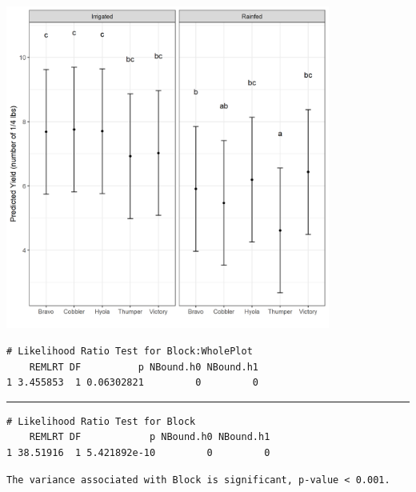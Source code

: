 \documentclass[a4paper, 10pt, fleqn, twosided]{memoir}
\begin{document}
\begin{tcolorbox}[title = Exercise 14 output continued]
\includegraphics[width=0.8\textwidth, frame]{Exercise14Pred.png}
\end{tcolorbox}

\begin{tcolorbox}[title = Exercise 14 output]
\begin{verbatim}
# Likelihood Ratio Test for Block:WholePlot
    REMLRT DF          p NBound.h0 NBound.h1
1 3.455853  1 0.06302821         0         0
\end{verbatim}
{\color{outpt} {\hrule height 1pt}}

\begin{verbatim}
# Likelihood Ratio Test for Block
    REMLRT DF            p NBound.h0 NBound.h1
1 38.51916  1 5.421892e-10         0         0
\end{verbatim}
\end{tcolorbox}

\begin{tcolorbox}[title = Exercise 14 interpretation]
\begin{verbatim}
The variance associated with Block is significant, p-value < 0.001.
\end{verbatim}
\end{tcolorbox}
\end{document}
